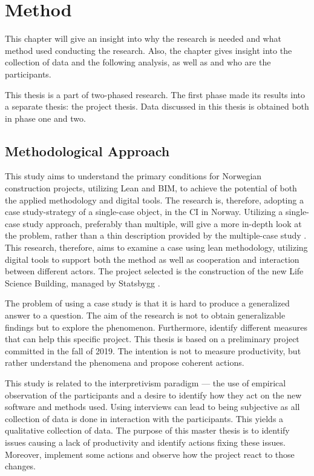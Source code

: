 
\chapter{Method} \label{chp:method}
This chapter will give an insight into why the research is needed and what method used conducting the research. Also, the chapter gives insight into the collection of data and the following analysis, as well as and who are the participants. 

This thesis is a part of two-phased research. The first phase made its results into a separate thesis: the project thesis. Data discussed in this thesis is obtained both in phase one and two. 

\section{Methodological Approach} \label{sec:purpose}
This study aims to understand the primary conditions for Norwegian construction projects, utilizing Lean and BIM, to achieve the potential of both the applied methodology and digital tools. The research is, therefore, adopting a case study-strategy of a single-case object, in the CI in Norway. Utilizing a single-case study approach, preferably than multiple, will give a more in-depth look at the problem, rather than a thin description provided by the multiple-case study \citep{yin1993case}. This research, therefore, aims to examine a case using lean methodology, utilizing digital tools to support both the method as well as cooperation and interaction between different actors. The project selected is the construction of the new Life Science Building, managed by Statsbygg \citep{statsbygg2019uio}.   

The problem of using a case study is that it is hard to produce a generalized answer to a question. The aim of the research is not to obtain generalizable findings but to explore the phenomenon. Furthermore, identify different measures that can help this specific project. This thesis is based on a preliminary project committed in the fall of 2019. The intention is not to measure productivity, but rather understand the phenomena and propose coherent actions.

This study is related to the interpretivism paradigm — the use of empirical observation of the participants and a desire to identify how they act on the new software and methods used. Using interviews can lead to being subjective as all collection of data is done in interaction with the participants. This yields a qualitative collection of data. The purpose of this master thesis is to identify issues causing a lack of productivity and identify actions fixing these issues. Moreover, implement some actions and observe how the project react to those changes. 

